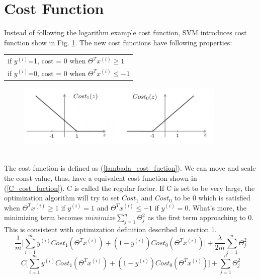 \documentclass{article}
\begin{document}
\section{Cost Function}
Instead of following the logarithm example cost function, SVM introduces cost function show in Fig. \ref{example_cost_funtion_visulization}. The new cost functions have following properties:
\begin{table}[h]
\begin{center}
\begin{tabular}{l}
if $y^{(i)}$=1, cost = 0 when $\Theta^{T}x^{(i)} \ge 1$\\
if $y^{(i)}$=0, cost = 0 when $\Theta^{T}x^{(i)} \le -1$\\
\end{tabular}
\end{center}
\end{table}
\begin{figure}[ht]
  \centering
  \includegraphics[width=10cm]{Figure3.jpg}\\
  \caption{}\label{example_cost_funtion_visulization}
\end{figure}
\\The cost function is defined as (\ref{lambada_cost_fuction}). We can move and scale the const value, thus, have a equivalent cost function shown in (\ref{C_cost_fuction}). C is called the regular factor. If C is set to be very large, the optimization algorithm will try to set $Cost_{1}$ and $Cost_{0}$ to be 0 which is satisfied when $\Theta^{T}x^{(i)} \ge 1$ if $y^{(i)} = 1$ and $\Theta^{T}x^{(i)} \le -1$ if $y^{(i)} = 0$. What's more, the minimizing term becomes $minimize \sum_{j=1}^{n}\Theta_{j}^{2}$ as the first term approaching to 0. This is consistent with optimization definition described in section 1.
\begin{equation}\label{lambada_cost_fuction}
\frac{1}{m} \biggl[\sum_{i=1}^{m} y^{(i)}Cost_{1}(\Theta^{T}x^{(i)}) + (1 - y^{(i)})Cost_{0}(\Theta^{T}x^{(i)})\biggr] + \frac{\lambda}{2m}\sum_{j=1}^{n}\Theta_{j}^{2}
\end{equation}
\begin{equation}\label{C_cost_fuction}
C\biggl[\sum_{i=1}^{m} y^{(i)}Cost_{1}(\Theta^{T}x^{(i)}) + (1 - y^{(i)})Cost_{0}(\Theta^{T}x^{(i)})\biggr] + \sum_{j=1}^{n}\Theta_{j}^{2}
\end{equation}
\end{document}
